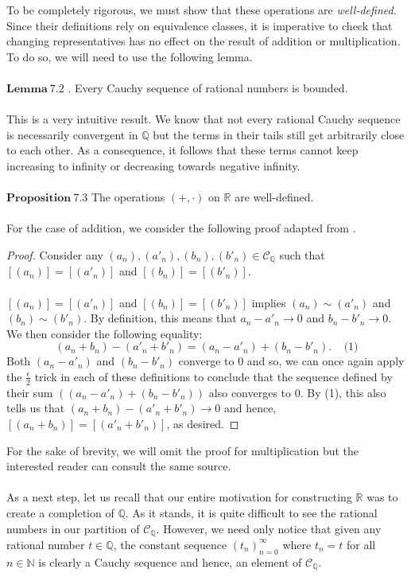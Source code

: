 \documentclass[12pt]{article}
\theoremstyle{definition}
\theoremstyle{remark}
\begin{document}
 \noindent To be completely rigorous, we must show that these operations are \textit{well-defined}. Since their definitions rely on equivalence classes, it is imperative to check that changing representatives has no effect on the result of addition or multiplication. To do so, we will need to use the following lemma.\\\\
 $\mathbf{Lemma\ 7.2}$ \cite[pg.506]{new}. Every Cauchy sequence of rational numbers is bounded.\\\\
 This is a very intuitive result. We know that not every rational Cauchy sequence is necessarily convergent in $\mathbb{Q}$ but the terms in their tails still get arbitrarily close to each other. As a consequence, it follows that these terms cannot keep increasing to infinity or decreasing towards negative infinity.\\\\
\noindent $\mathbf{Proposition\ 7.3}$ The operations $(+,\cdot)$ on $\mathbb{R}$ are well-defined.\\\\
For the case of addition, we consider the following proof adapted from \cite[pg.507]{new}.
	\begin{proof}
Consider any $(a_n),(a'_n),(b_n),(b'_n)\in\mathscr{C}_\mathbb{Q}$ such that $[(a_n)]=[(a'_n)]$ and $[(b_n)]=[(b'_n)]$.\\\\
$[(a_n)]=[(a'_n)]$ and $[(b_n)]=[(b'_n)]$ implies $(a_n)\sim (a'_n)$ and $(b_n)\sim (b'_n)$. By definition, this means that $a_n-a'_n\rightarrow 0$ and $b_n-b'_n\rightarrow 0$. We then consider the following equality: $$(a_n+b_n)-(a'_n+b'_n)=(a_n-a'_n)+(b_n-b'_n).\ \ \ \ \ \text{(1)}$$ Both $(a_n-a'_n)$ and $(b_n-b'_n)$ converge to $0$ and so, we can once again apply the $\frac{\epsilon}{2}$ trick in each of these definitions to conclude that the sequence defined by their sum $((a_n-a'_n)+(b_n-b'_n))$ also converges to $0$. By (1), this also tells us that $(a_n+b_n)-(a'_n+b'_n)\rightarrow 0$ and hence, $[(a_n+b_n)]=[(a'_n+b'_n)]$, as desired.
	\end{proof}
\noindent For the sake of brevity, we will omit the proof for multiplication but the interested reader can consult the same source.\\\\
\noindent As a next step, let us recall that our entire motivation for constructing $\mathbb{R}$ was to create a completion of $\mathbb{Q}$. As it stands, it is quite difficult to see the rational numbers in our partition of $\mathscr{C}_\mathbb{Q}$. However, we need only notice that given any rational number $t\in\mathbb{Q}$, the constant sequence $(t_n)_{n=0}^\infty$ where $t_n=t$ for all $n\in\mathbb{N}$ is clearly a Cauchy sequence and hence, an element of $\mathscr{C}_\mathbb{Q}$.\\
\end{document}
